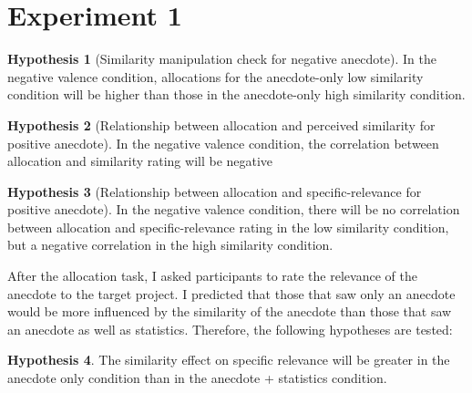 \documentclass[a4paper, nobind, dvipsnames]{templates/ociamthesis}
\theoremstyle{definition}
\theoremstyle{definition}
\theoremstyle{definition}
\theoremstyle{definition}
\newtheorem{hypothesis}{Hypothesis}[chapter]
\theoremstyle{remark}
\begin{document}
\hypertarget{anecdotes-1-appendix}{%
\section{Experiment 1}\label{anecdotes-1-appendix}}

\begin{hypothesis}[Similarity manipulation check for negative anecdote]
\protect\hypertarget{hyp:similarity-check-anecdotes-1}{}{\label{hyp:similarity-check-anecdotes-1} {} }In the negative valence condition, allocations for the anecdote-only low
similarity condition will be higher than those in the anecdote-only high
similarity condition.
\end{hypothesis}

\begin{hypothesis}[Relationship between allocation and perceived similarity for positive anecdote]
\protect\hypertarget{hyp:allocation-similarity-anecdotes-1}{}{\label{hyp:allocation-similarity-anecdotes-1} {} }In the negative valence condition, the correlation between allocation and
similarity rating will be negative
\end{hypothesis}

\begin{hypothesis}[Relationship between allocation and specific-relevance for positive anecdote]
\protect\hypertarget{hyp:allocation-specific-relevance-anecdotes-1}{}{\label{hyp:allocation-specific-relevance-anecdotes-1} {} }In the negative valence condition, there will be no correlation between
allocation and specific-relevance rating in the low similarity condition, but a
negative correlation in the high similarity condition.
\end{hypothesis}

After the allocation task, I asked participants to rate the relevance of the
anecdote to the target project. I predicted that those that saw only an
anecdote would be more influenced by the similarity of the anecdote than those
that saw an anecdote as well as statistics. Therefore, the following hypotheses
are tested:

\begin{hypothesis}
\protect\hypertarget{hyp:relevance-specific-anecdotes-1}{}{\label{hyp:relevance-specific-anecdotes-1} }The similarity effect on specific relevance will be greater in the anecdote only
condition than in the anecdote + statistics condition.
\end{hypothesis}
\end{document}
